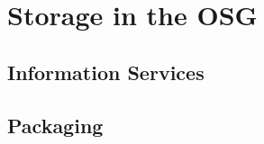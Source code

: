 \documentclass{beamer}
\begin{document}
\section{Storage in the OSG}
\subsection{Information Services}
\subsection{Packaging}
\end{document}
